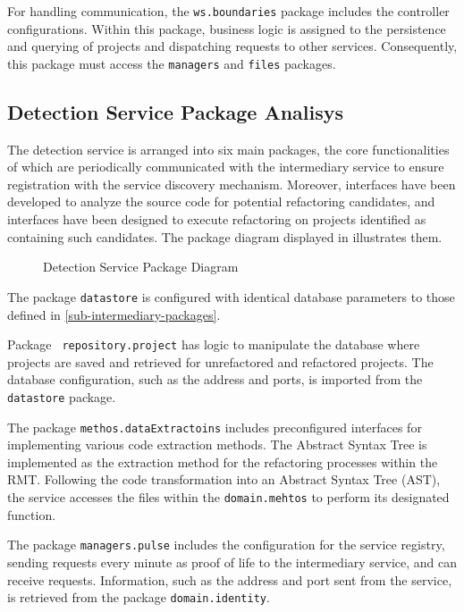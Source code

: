 For handling communication, the \texttt{ws.boundaries} package includes the controller configurations. Within this package, business logic is assigned to the persistence and querying of projects and dispatching requests to other services. Consequently, this package must access the \texttt{managers} and \texttt{files} packages.

\subsection{Detection Service Package Analisys}

The detection service is arranged into six main packages, the core functionalities of which are periodically communicated with the intermediary service to ensure registration with the service discovery mechanism. Moreover, interfaces have been developed to analyze the source code for potential refactoring candidates, and interfaces have been designed to execute refactoring on projects identified as containing such candidates. The package diagram displayed in  illustrates them.
\begin{figure}[ht!]
\SetCaptionWidth{\textwidth}
\caption{Detection Service Package Diagram}
\label{fig-package-detection}
\fontsize{7.5}{9.5}\selectfont

\end{figure}
\FloatBarrier

The package \texttt{datastore} is configured with identical database parameters to those defined in \cref{sub-intermediary-packages}.

Package \texttt{ repository.project} has logic to manipulate the database where projects are saved and retrieved for unrefactored and refactored projects. The database configuration, such as the address and ports, is imported from the \texttt{datastore} package.

The package \texttt{methos.dataExtractoins} includes preconfigured interfaces for implementing various code extraction methods. The Abstract Syntax Tree is implemented as the extraction method for the refactoring processes within the RMT. Following the code transformation into an Abstract Syntax Tree (AST), the service accesses the files within the \texttt{domain.mehtos} to perform its designated function.

The package \texttt{managers.pulse} includes the configuration for the service registry, sending requests every minute as proof of life to the intermediary service, and can receive requests. Information, such as the address and port sent from the service, is retrieved from the package \texttt{domain.identity}.

